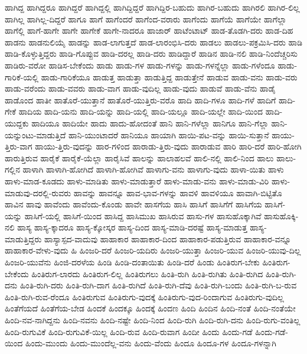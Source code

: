 {ಹಾಗಿದ್ದ
ಹಾಗಿದ್ದರೂ
ಹಾಗಿದ್ದರೆ
ಹಾಗಿದ್ದಲ್ಲಿ
ಹಾಗಿದ್ದಿದ್ದರೆ
ಹಾಗಿದ್ದಿರ-ಬಹುದು
ಹಾಗಿರ-ಬಹುದು
ಹಾಗಿರಲಿ
ಹಾಗಿರ-ಲಿಲ್ಲ
ಹಾಗಿಲ್ಲ
ಹಾಗಿಲ್ಲ-ದಿದ್ದರೆ
ಹಾಗೂ
ಹಾಗೆ
ಹಾಗೆಂದರೆ
ಹಾಗೆಂದ-ವರಾರು
ಹಾಗೆಂದು
ಹಾಗೆಯೆ
ಹಾಗೆಯೇ
ಹಾಗೆಲ್ಲಾ
ಹಾಗೆಲ್ಲಿ
ಹಾಗೆ-ಹಾಗೇ
ಹಾಗೇ
ಹಾಗೇಕೆ
ಹಾಗೇ-ನಾದರೂ
ಹಾಜಾರ್
ಹಾಟೆಂಟಾಟ್
ಹಾಡ-ತೊಡಗಿ-ದರು
ಹಾಡ-ದಿಹ
ಹಾಡನು
ಹಾಡನುಲಿಯೈ
ಹಾಡನ್ನು
ಹಾಡ-ಲಾಗುತ್ತದೆ
ಹಾಡ-ಲಾರಂಭಿಸಿ-ದರು
ಹಾಡಲು
ಹಾಡಲು-ಪಕ್ರಮಿಸಿ-ದರು
ಹಾಡಿ
ಹಾಡಿ-ಕೊಳ್ಳುತ್ತಿದ್ದರು
ಹಾಡಿ-ಗೊಪ್ಪುವ
ಹಾಡಿ-ದರಲ್ಲ
ಹಾಡಿ-ದರು
ಹಾಡಿದ್ದಾರೆ
ಹಾಡಿನ
ಹಾಡಿ-ನಲಿ
ಹಾಡಿ-ನಿಂದೆಚ್ಚರಿಸು
ಹಾಡಿರು-ವರೋ
ಹಾಡಿಸ-ಬೇಕೆಂದು
ಹಾಡು
ಹಾಡು-ಗಳ
ಹಾಡು-ಗಳನ್ನು
ಹಾಡು-ಗಳನ್ನೆಲ್ಲಾ
ಹಾಡು-ಗಳೆಂದೂ
ಹಾಡು-ಗಾರಿಕೆ-ಯಲ್ಲಿ
ಹಾಡು-ಗಾರಿಕೆಯೂ
ಹಾಡುತ್ತ
ಹಾಡುತ್ತಾ
ಹಾಡುತ್ತಿದ್ದ
ಹಾಡುತ್ತೇನೆ
ಹಾಡುವ
ಹಾಡು-ವನು
ಹಾಡು-ವರು
ಹಾಡು-ವರೆಂದು
ಹಾಡು-ವವರು
ಹಾಡು-ವಾಗ
ಹಾಡು-ವುದಿಲ್ಲ
ಹಾಡು-ವುದು
ಹಾಡುವೆ
ಹಾಡು-ವೆನು
ಹಾಡೈ
ಹಾಡೊಂದ
ಹಾತೀ
ಹಾತೊರೆ-ಯುತ್ತಾನೆ
ಹಾತೊರೆ-ಯುತ್ತಿರು-ವರೊ
ಹಾದಿ
ಹಾದಿ-ಗಳೂ
ಹಾದಿ-ಗಳೆ
ಹಾದಿಗೆ
ಹಾದಿ-ಗೇಕೆ
ಹಾದಿಯ
ಹಾದಿ-ಯನು
ಹಾದಿ-ಯನ್ನು
ಹಾದಿ-ಯಲ್ಲಿ
ಹಾದಿ-ಯಲ್ಲೂ
ಹಾದಿ-ಯಲ್ಲೇ
ಹಾದಿ-ಯಿಂದ
ಹಾದಿ-ಯುದ್ದಕು
ಹಾದಿಯೂ
ಹಾದಿಯೇ
ಹಾದು
ಹಾದು-ಹೋದಂತೆ
ಹಾನಿ
ಹಾನಿ-ಗಳೆಲ್ಲಾ
ಹಾನಿಗೂ
ಹಾನಿ-ಗೆಲ್ಲಾ
ಹಾನಿ-ಯನ್ನುಂಟು-ಮಾಡುತ್ತಿದೆ
ಹಾನಿ-ಯುಂಟಾದರೆ
ಹಾನಿಯೂ
ಹಾಯಾಗಿ
ಹಾಯಿ-ಪಟ-ವನ್ನು
ಹಾಯಿ-ಸುತ್ತಾನೆ
ಹಾಯು-ತ್ತಿರು-ವಾಗ
ಹಾಯು-ತ್ತಿರು-ವುದನ್ನು
ಹಾರ-ಗಳಿಂದ
ಹಾರಾಡು-ತ್ತಿರು-ವುದು
ಹಾರಾಡುವ
ಹಾರಿ
ಹಾರಿ-ದರೆ
ಹಾರಿ-ಹೋಗಿ
ಹಾರುತ್ತಿರುವ
ಹಾರೈಕೆ
ಹಾರೈಕೆ-ಯೆಲ್ಲಾ
ಹಾರೈಸಿವೆ
ಹಾಲನ್ನು
ಹಾಲಾಹಲವೆ
ಹಾಲಿ-ನಲ್ಲಿ
ಹಾಲಿ-ನಿಂದ
ಹಾಲು
ಹಾಲು-ಗಲ್ಲಿನ
ಹಾಳಾಗಿ
ಹಾಳಾಗಿ-ಹೋಗಿದೆ
ಹಾಳಾಗಿ-ಹೋಗಿವೆ
ಹಾಳಾಗು-ವನು
ಹಾಳಾಗು-ವುದು
ಹಾಳಾ-ಯಿತು
ಹಾಳು
ಹಾಳು-ಮಾಡ-ಕೂಡದು
ಹಾಳು-ಮಾಡಿತು
ಹಾಳು-ಮಾಡುತ್ತಾರೆ
ಹಾಳು-ಮಾಡು-ವನು
ಹಾಳು-ಮಾಡು-ವಿರಿ
ಹಾಳು-ಮಾಡುವು-ದರಲ್ಲಿ-ರುವರು
ಹಾವನ್ನು
ಹಾವನ್ನೂ
ಹಾವ-ಭಾವ-ಗಳನ್ನು
ಹಾವಳಿ
ಹಾವಳಿಯೂ
ಹಾವಾಗಿ-ಬಿಟ್ಟಿತೊ
ಹಾವಿನ
ಹಾವು
ಹಾವೆಂದು
ಹಾವೆಂದು-ಕೊಂಡು
ಹಾವೇ
ಹಾಸಗೆಯ
ಹಾಸಿ
ಹಾಸಿಗೆ
ಹಾಸಿಗೆಗೆ
ಹಾಸಿಗೆಯ
ಹಾಸಿಗೆ-ಯನ್ನು
ಹಾಸಿಗೆ-ಯಲ್ಲಿ
ಹಾಸಿಗೆ-ಯಿಂದ
ಹಾಸಿದ್ದ
ಹಾಸಿಮುಖ
ಹಾಸಿರುವ
ಹಾಸು-ಗಳ
ಹಾಸುಹೊಕ್ಕಾಗಿವೆ
ಹಾಸುಹೊಕ್ಕಿ-ನಲಿ
ಹಾಸ್ಯ
ಹಾಸ್ಯ-ಕ್ಕಾದರೂ
ಹಾಸ್ಯ-ಕ್ಕೋಸ್ಕರ
ಹಾಸ್ಯ-ದಿಂದ
ಹಾಸ್ಯ-ಮಾಡಿ-ದರಷ್ಟೆ
ಹಾಸ್ಯ-ಮಾಡುತ್ತ
ಹಾಸ್ಯ-ಮಾಡುತ್ತಿದ್ದರು
ಹಾಸ್ಯಾಸ್ಪದ-ವಾದುವು
ಹಾಹಾಕಾರ
ಹಾಹಾಕಾರ-ದಿಂದ
ಹಾಹಾಕಾರ-ಪಡುತ್ತಿರುವ
ಹಾಹಾಕಾರ-ವನ್ನೂ
ಹಾಹಾಕಾರ-ವೇಳು-ವುದು
ಹಿ
ಹಿಂಜರಿ-ದರೆ
ಹಿಂಜರಿ-ಯದಿರು
ಹಿಂಜರಿ-ಯುತ್ತಾ
ಹಿಂಜರಿ-ಯುವ
ಹಿಂಜರಿ-ಯುವು-ದಿಲ್ಲ
ಹಿಂಜರಿ-ಯುವೆನು
ಹಿಂಜಿ-ದರಳೆಯ
ಹಿಂಡಿ
ಹಿಂಡಿ-ದಂತಾಯಿತು
ಹಿಂಡಿ-ದರೆ
ಹಿಂಡು
ಹಿಂತಿರುಗ-ಬೇಕು
ಹಿಂತಿರುಗ-ಬೇಕೆಂದು
ಹಿಂತಿರುಗ-ಲಾರದು
ಹಿಂತಿರುಗ-ಲಿಲ್ಲ
ಹಿಂತಿರುಗಲು
ಹಿಂತಿ-ರುಗಿ
ಹಿಂತಿ-ರುಗಿತು
ಹಿಂತಿ-ರುಗಿದ
ಹಿಂತಿ-ರುಗಿ-ದನು
ಹಿಂತಿ-ರುಗಿ-ದರು
ಹಿಂತಿ-ರುಗಿ-ದಾಗ
ಹಿಂತಿ-ರುಗಿದೆ
ಹಿಂತಿ-ರುಗಿ-ದೆವು
ಹಿಂತಿ-ರುಗಿ-ಬಂದು
ಹಿಂತಿ-ರುಗಿ-ಬ-ರುವ
ಹಿಂತಿ-ರುಗಿ-ರುವ-ರೆಂದೂ
ಹಿಂತಿರುಗುವ
ಹಿಂತಿರುಗು-ವುದಕ್ಕೆ
ಹಿಂತಿರುಗು-ವುದ-ರಿಂದಾಗುವ
ಹಿಂತಿರುಗು-ವುದಿಲ್ಲ
ಹಿಂತೆಗೆಯದೆ
ಹಿಂತೆಗೆಯ-ಬೇಡ
ಹಿಂದಕೆ
ಹಿಂದಕ್ಕೂ
ಹಿಂದಕ್ಕೆ
ಹಿಂದಣ
ಹಿಂದಿ
ಹಿಂದಿನ
ಹಿಂದಿ-ನಂತೆ
ಹಿಂದಿ-ನಂತೆಯೇ
ಹಿಂದಿ-ನವ-ನಾಗಿದ್ದನು
ಹಿಂದಿ-ನವನು
ಹಿಂದಿ-ನಷ್ಟೇ
ಹಿಂದಿ-ನಿಂದ
ಹಿಂದಿ-ರುಗಿ
ಹಿಂದಿ-ರುಗಿ-ದನು
ಹಿಂದಿ-ರುಗು-ವಂತಿಲ್ಲ
ಹಿಂದಿ-ರುಗುವಿಕೆ
ಹಿಂದಿ-ರುಗುವಿಕೆ-ಯಿಲ್ಲ
ಹಿಂದಿ-ರುವ
ಹಿಂದಿ-ರುವಾಗ
ಹಿಂದೀ
ಹಿಂದು
ಹಿಂದು-ಗಡೆ
ಹಿಂದು-ಗಡೆ-ಯಿಂದ
ಹಿಂದು-ಮುಂದು
ಹಿಂದು-ಮುಂದೆಲ್ಲ-ವನು
ಹಿಂದು-ವೆಂದು
ಹಿಂದೂ
ಹಿಂದೂ-ಗಳ
ಹಿಂದೂ-ಗಳನ್ನಾಗಿ
}
